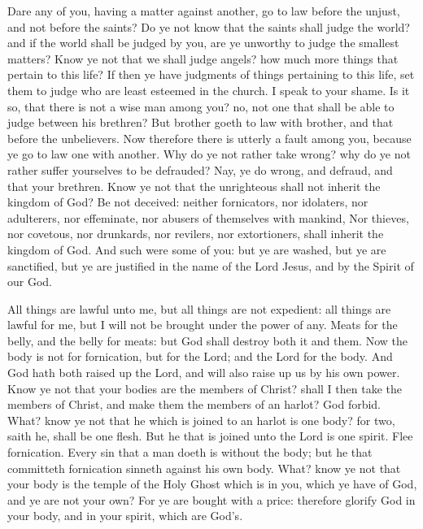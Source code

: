  Dare any of you, having a matter against another, go to law
before the unjust, and not before the saints?  Do ye not
know that the saints shall judge the world? and if the world shall be
judged by you, are ye unworthy to judge the smallest matters?
 Know ye not that we shall judge angels? how much more
things that pertain to this life?  If then ye have judgments
of things pertaining to this life, set them to judge who are least
esteemed in the church.  I speak to your shame. Is it so,
that there is not a wise man among you? no, not one that shall be able
to judge between his brethren?  But brother goeth to law
with brother, and that before the unbelievers.  Now
therefore there is utterly a fault among you, because ye go to law one
with another. Why do ye not rather take wrong? why do ye not rather
suffer yourselves to be defrauded?  Nay, ye do wrong, and
defraud, and that your brethren.  Know ye not that the
unrighteous shall not inherit the kingdom of God? Be not deceived:
neither fornicators, nor idolaters, nor adulterers, nor effeminate, nor
abusers of themselves with mankind,  Nor thieves, nor
covetous, nor drunkards, nor revilers, nor extortioners, shall inherit
the kingdom of God.  And such were some of you: but ye are
washed, but ye are sanctified, but ye are justified in the name of the
Lord Jesus, and by the Spirit of our God.

 All things are lawful unto me, but all things are not
expedient: all things are lawful for me, but I will not be brought under
the power of any.  Meats for the belly, and the belly for
meats: but God shall destroy both it and them. Now the body is not for
fornication, but for the Lord; and the Lord for the body. 
And God hath both raised up the Lord, and will also raise up us by his
own power.  Know ye not that your bodies are the members of
Christ? shall I then take the members of Christ, and make them the
members of an harlot? God forbid.  What? know ye not that
he which is joined to an harlot is one body? for two, saith he, shall be
one flesh.  But he that is joined unto the Lord is one
spirit.  Flee fornication. Every sin that a man doeth is
without the body; but he that committeth fornication sinneth against his
own body.  What? know ye not that your body is the temple
of the Holy Ghost which is in you, which ye have of God, and ye are not
your own?  For ye are bought with a price: therefore
glorify God in your body, and in your spirit, which are God's.

